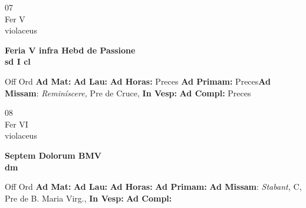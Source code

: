 \documentclass[10pt, openany]{book}
\begin{document}
    \begin{center}
        \begin{minipage}{3.5in}
            \vspace{2em}
            \begin{minipage}{0.5in}
                {\Huge 07} \\
                {\normalsize Fer V} \\
                {\normalsize violaceus}
            \end{minipage}
            \begin{minipage}{3.0in}
                \textbf{ \large Feria V infra Hebd de Passione \\
                \textnormal{\normalsize sd I cl}} \\ 
            \end{minipage}
            \begin{justify}Off Ord
                \textbf{Ad Mat: }
                \textbf{Ad Lau: }
                \textbf{Ad Horas: }Preces
                \textbf{Ad Primam: }Preces\textbf{Ad Missam}: \textit{Reminíscere,} Pre de Cruce,  
                \textbf{In Vesp: }
                \textbf{Ad Compl: }Preces
            \end{justify}
        \end{minipage}
    \end{center}

    \begin{center}
        \begin{minipage}{3.5in}
            \vspace{2em}
            \begin{minipage}{0.5in}
                {\Huge 08} \\
                {\normalsize Fer VI} \\
                {\normalsize violaceus}
            \end{minipage}
            \begin{minipage}{3.0in}
                \textbf{ \large Septem Dolorum BMV \\
                \textnormal{\normalsize dm}} \\ 
            \end{minipage}
            \begin{justify}Off Ord
                \textbf{Ad Mat: }
                \textbf{Ad Lau: }
                \textbf{Ad Horas: }
                \textbf{Ad Primam: }\textbf{Ad Missam}: \textit{Stabant,} C, Pre de B. Maria Virg.,  
                \textbf{In Vesp: }
                \textbf{Ad Compl: }
            \end{justify}
        \end{minipage}
    \end{center}
\end{document}

